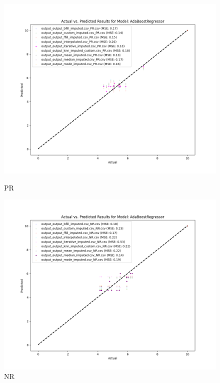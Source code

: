 \begin{figure}[H]
    \centering
    \begin{minipage}{0.495\textwidth}
        \centering
        \includegraphics[width=\linewidth]{reg_section_specific/images_reg_training/PR_AdaBoostRegressor_plot.png}
        \caption{PR}
        \label{fig_reg_spec:pr_reg_training}
    \end{minipage}\hfill
    \begin{minipage}{0.495\textwidth}
        \centering
        \includegraphics[width=\linewidth]{reg_section_specific/images_reg_training/NR_AdaBoostRegressor_plot.png}
        \caption{NR}
        \label{fig_reg_spec:nr_reg_training}
    \end{minipage}
\end{figure}

